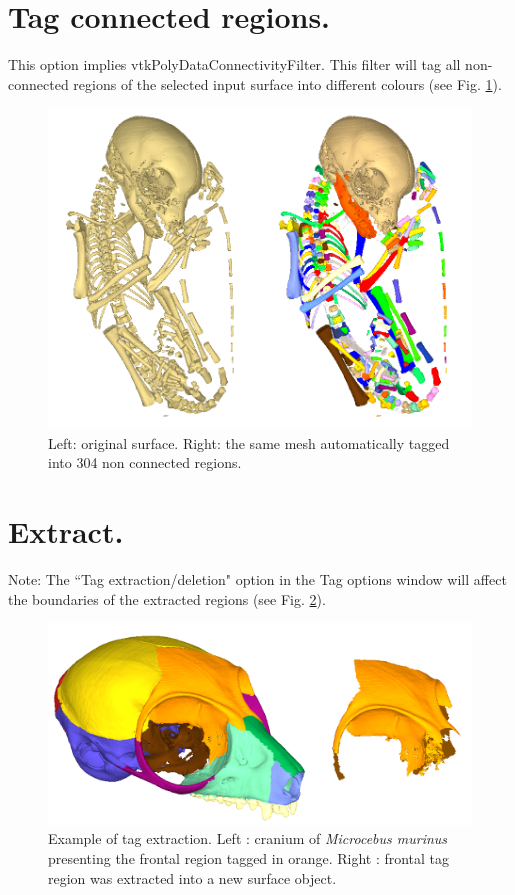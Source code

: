 \section{Tag connected regions.}
This option implies vtkPolyDataConnectivityFilter. This filter will tag all non-connected regions of the
selected input surface into different colours (see Fig. \ref{tag_connected}).
\begin{figure}
  \centering
  \includegraphics[scale=0.45]{images/Tags/Lemur_tag_input_output.png} 
	\caption{Left: original surface. Right: the same mesh automatically tagged into 304 non connected regions.}
\label{tag_connected}
 
\end{figure}



\section{Extract.}


Note: The ``Tag extraction/deletion" option in the Tag options window will affect the boundaries of
the extracted regions (see Fig. \ref{tag_extraction}).

\begin{figure}
  \centering
  \includegraphics[scale=0.35]{images/Tags/Extract_tag.png} 
	\caption{Example of tag extraction. Left : cranium of \textit{Microcebus murinus} presenting the frontal region
tagged in orange. Right : frontal tag region was extracted into a new surface object.}
\label{tag_extraction}
 
\end{figure}



